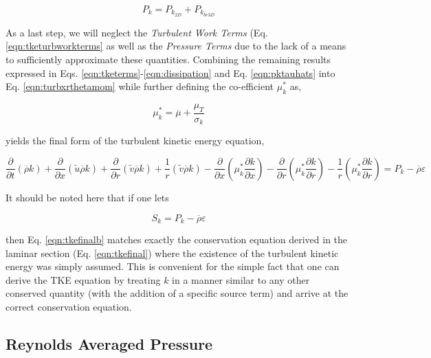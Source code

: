 \begin{equation}
	P_k = P_{k_{2D}} + P_{k_{be3D}}
\label{eqn:pktauhats}
\end{equation}

	As a last step, we will neglect the \emph{Turbulent Work Terms} (Eq. \ref{eqn:tketurbworkterms} as well as 
the \emph{Pressure Terms} due to
the lack of a means to sufficiently approximate these quantities.  Combining the remaining results expressed in 
Eqs. \ref{eqn:tketerms}-\ref{eqn:dissipation} and Eq. \ref{eqn:pktauhats} into Eq. \ref{eqn:turbxrthetamom} while further
defining the co-efficient $\mu^*_k$ as,

\begin{equation}
	\mu^*_k = \overline{\mu} + \frac{\mu_T}{\sigma_k}
\label{eqn:mukstar}
\end{equation}

yields the final form of the turbulent kinetic energy equation,

\begin{equation}
	\frac{\partial}{\partial t}(\overline{\rho} k)
	+ \frac{\partial}{\partial x}(\tilde u \overline{\rho} k) + \frac{\partial}{\partial r}(\tilde v \overline{\rho} k)
	+ \frac{1}{r}(\tilde v \overline{\rho} k)
	- \frac{\partial}{\partial x}(\mu^*_k\frac{\partial k}{\partial x})
	- \frac{\partial}{\partial r}(\mu^*_k\frac{\partial k}{\partial r}) 
	- \frac{1}{r}(\mu^*_k\frac{\partial k}{\partial r})
	= P_k - \overline{\rho} \varepsilon
\label{eqn:tkefinalb}
\end{equation}

	It should be noted here that if one lets 

\begin{equation}
	S_k = P_k - \overline{\rho}\varepsilon
\label{eqn:sk}
\end{equation}

	then Eq. \ref{eqn:tkefinalb} matches
exactly the conservation equation derived in the laminar section (Eq. \ref{eqn:tkefinal}) where the existence of the turbulent 
kinetic energy was simply assumed.  This is convenient for the simple fact that one can derive the TKE equation by treating 
$k$ in a manner similar to any other conserved quantity (with the addition of a 
specific source term) and arrive at the correct conservation equation.

\subsection{Reynolds Averaged Pressure}
	
